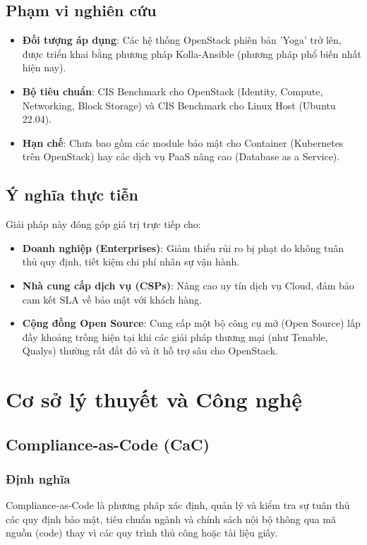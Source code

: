 \documentclass[12pt,a4paper]{report}
\begin{document}
\section{Phạm vi nghiên cứu}
\begin{itemize}
    \item \textbf{Đối tượng áp dụng}: Các hệ thống OpenStack phiên bản 'Yoga' trở lên, được triển khai bằng phương pháp Kolla-Ansible (phương pháp phổ biến nhất hiện nay).
    \item \textbf{Bộ tiêu chuẩn}: CIS Benchmark cho OpenStack (Identity, Compute, Networking, Block Storage) và CIS Benchmark cho Linux Host (Ubuntu 22.04).
    \item \textbf{Hạn chế}: Chưa bao gồm các module bảo mật cho Container (Kubernetes trên OpenStack) hay các dịch vụ PaaS nâng cao (Database as a Service).
\end{itemize}

\section{Ý nghĩa thực tiễn}
Giải pháp này đóng góp giá trị trực tiếp cho:
\begin{itemize}
    \item \textbf{Doanh nghiệp (Enterprises)}: Giảm thiểu rủi ro bị phạt do không tuân thủ quy định, tiết kiệm chi phí nhân sự vận hành.
    \item \textbf{Nhà cung cấp dịch vụ (CSPs)}: Nâng cao uy tín dịch vụ Cloud, đảm bảo cam kết SLA về bảo mật với khách hàng.
    \item \textbf{Cộng đồng Open Source}: Cung cấp một bộ công cụ mở (Open Source) lấp đầy khoảng trống hiện tại khi các giải pháp thương mại (như Tenable, Qualys) thường rất đắt đỏ và ít hỗ trợ sâu cho OpenStack.
\end{itemize}

\chapter{Cơ sở lý thuyết và Công nghệ}

\section{Compliance-as-Code (CaC)}
\subsection{Định nghĩa}
Compliance-as-Code là phương pháp xác định, quản lý và kiểm tra sự tuân thủ các quy định bảo mật, tiêu chuẩn ngành và chính sách nội bộ thông qua mã nguồn (code) thay vì các quy trình thủ công hoặc tài liệu giấy.
\end{document}
